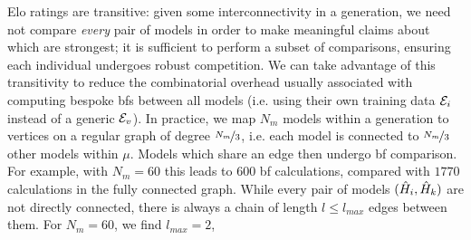 \par 
\glspl{Elo rating} are transitive: given some interconnectivity in a generation, 
    we need not compare \emph{every} pair of models in order to 
    make meaningful claims about which are strongest;
    it is sufficient to perform a subset of comparisons, 
    ensuring each individual undergoes robust competition.
We can take advantage of this transitivity to reduce the combinatorial overhead 
    usually associated with computing bespoke \glspl{bf} between all models 
    (i.e. using their own training data ${ \mathcal{E} }_i$ instead of a generic 
    ${ \mathcal{E} }_v$).
In practice, we map $N_m$ models within a generation to vertices on a regular graph
    of degree $\nicefrac{N_m}{3}$, i.e. each model is connected to $\nicefrac{N_m}{3}$ 
    other models within $\mu$. 
Models which share an edge then undergo \gls{bf} comparison. 
For example, with $N_m=60$ this leads to $600$ \gls{bf} calculations, 
    compared with $1770$ calculations in the fully connected graph. 
While every pair of models $(\hat{H}_i, \hat{H}_{k})$ are not directly connected, 
    there is always a chain of length $l \leq l_{max}$ edges between them.
For $N_m=60$, we find $l_{max}=2$, 
